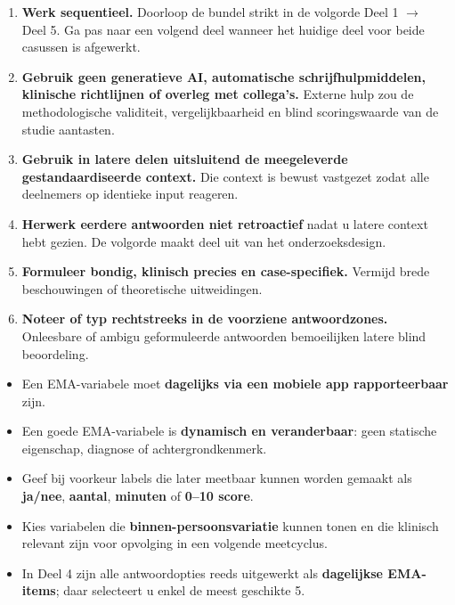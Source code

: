 \documentclass[11pt,a4paper]{article}
\begin{document}
\begin{instrbox}[title=Gelieve deze instructies strikt te volgen]
\begin{enumerate}
\item \textbf{Werk sequentieel.} Doorloop de bundel strikt in de volgorde Deel 1 $\rightarrow$ Deel 5.
Ga pas naar een volgend deel wanneer het huidige deel voor beide casussen is afgewerkt.
\item \textbf{Gebruik geen generatieve AI, automatische schrijfhulpmiddelen, klinische richtlijnen of overleg met collega's.}
Externe hulp zou de methodologische validiteit, vergelijkbaarheid en blind scoringswaarde van de studie aantasten.
\item \textbf{Gebruik in latere delen uitsluitend de meegeleverde gestandaardiseerde context.}
Die context is bewust vastgezet zodat alle deelnemers op identieke input reageren.
\item \textbf{Herwerk eerdere antwoorden niet retroactief} nadat u latere context hebt gezien.
De volgorde maakt deel uit van het onderzoeksdesign.
\item \textbf{Formuleer bondig, klinisch precies en case-specifiek.} Vermijd brede beschouwingen of theoretische uitweidingen.
\item \textbf{Noteer of typ rechtstreeks in de voorziene antwoordzones.} Onleesbare of ambigu geformuleerde antwoorden bemoeilijken latere blind beoordeling.
\end{enumerate}
\end{instrbox}

\begin{instrbox}[title=EMA-principes voor Deel 2 en Deel 4]
\begin{itemize}
\item Een EMA-variabele moet \textbf{dagelijks via een mobiele app rapporteerbaar} zijn.
\item Een goede EMA-variabele is \textbf{dynamisch en veranderbaar}: geen statische eigenschap, diagnose of achtergrondkenmerk.
\item Geef bij voorkeur labels die later meetbaar kunnen worden gemaakt als \textbf{ja/nee}, \textbf{aantal}, \textbf{minuten} of \textbf{0--10 score}.
\item Kies variabelen die \textbf{binnen-persoonsvariatie} kunnen tonen en die klinisch relevant zijn voor opvolging in een volgende meetcyclus.
\item In Deel 4 zijn alle antwoordopties reeds uitgewerkt als \textbf{dagelijkse EMA-items}; daar selecteert u enkel de meest geschikte 5.
\end{itemize}
\end{instrbox}
\end{document}
